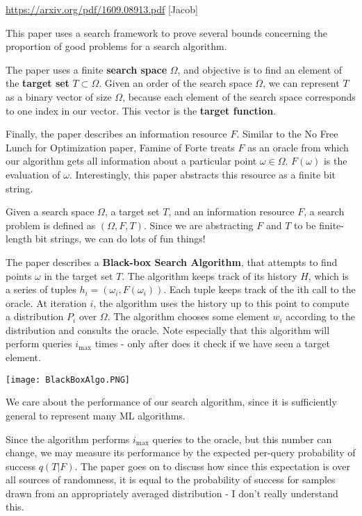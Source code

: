 \documentclass[12pt]{article}
\begin{document}
\url{https://arxiv.org/pdf/1609.08913.pdf} [Jacob]

This paper uses a search framework to prove several bounds concerning the proportion of good problems for a search algorithm. 

The paper uses a finite \textbf{search space} $\Omega$, and objective is to find an element of the \textbf{target set} $T \subset \Omega$. Given an order of the search space $\Omega$, we can represent $T$ as a binary vector of size $\Omega$, because each element of the search space corresponds to one index in our vector. This vector is the \textbf{target function}. 

Finally, the paper describes an information resource $F$. Similar to the No Free Lunch for Optimization paper, Famine of Forte treats $F$ as an oracle from which our algorithm gets all information about a particular point $\omega \in \Omega$. $F(\omega)$ is the evaluation of $\omega$. Interestingly, this paper abstracts this resource as a finite bit string. 

Given a search space $\Omega$, a target set $T$, and an information resource $F$, a search problem is defined as $(\Omega, F, T)$. Since we are abstracting $F$ and $T$ to be finite-length bit strings, we can do lots of fun things!

The paper describes a \textbf{Black-box Search Algorithm}, that attempts to find points $\omega$ in the target set $T$. The algorithm keeps track of its history $H$, which is a series of tuples $h_i = (\omega_i, F(\omega_i))$. Each tuple keeps track of the ith call to the oracle. At iteration $i$, the algorithm uses the history up to this point to compute a distribution $P_i$ over $\Omega$. The algorithm chooses some element $w_i$ according to the distribution and consults the oracle. Note especially that this algorithm will perform queries $i_{\text{max}}$ times - only after does it check if we have seen a target element.

\begin{center}
    \texttt{[image: BlackBoxAlgo.PNG]}
\end{center}

We care about the performance of our search algorithm, since it is sufficiently general to represent many ML algorithms. 

Since the algorithm performs $i_{\text{max}}$ queries to the oracle, but this number can change, we may measure its performance by the expected per-query probability of success $q(T|F)$. The paper goes on to discuss how since this expectation is over all sources of randomness, it is equal to the probability of success for samples drawn from an appropriately averaged distribution - I don't really understand this. 
\end{document}
